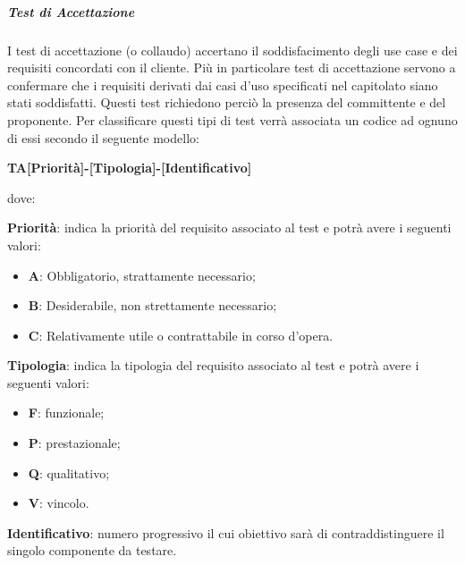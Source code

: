         \subparagraph*{Test di Accettazione}
            	I test di accettazione (o collaudo) accertano il soddisfacimento degli use case e dei requisiti concordati con il cliente.
                Più in particolare test di accettazione servono a confermare che i requisiti derivati dai casi d'uso specificati nel capitolato siano stati soddisfatti. Questi test richiedono perciò la presenza del committente e del proponente.  
                Per classificare questi tipi di test verrà associata un codice ad ognuno di essi secondo il seguente modello:
                
                \begin{center}
                \textbf{TA[Priorità]-[Tipologia]-[Identificativo]}
                \end{center}
                dove: 
                
                \textbf{Priorità}: indica la priorità del requisito associato al test e potrà avere i seguenti valori:
                \begin{itemize}
                    \item \textbf{A}: Obbligatorio, strattamente necessario;
                    \item \textbf{B}: Desiderabile, non strettamente necessario;
                    \item \textbf{C}: Relativamente utile o contrattabile in corso d'opera. 
                 \end{itemize} 
                 \textbf{Tipologia}: indica la tipologia del requisito associato al test e potrà avere i seguenti valori:
                 \begin{itemize}
                    \item \textbf{F}: funzionale;
                    \item \textbf{P}: prestazionale;
                    \item \textbf{Q}: qualitativo;
                    \item \textbf{V}: vincolo.
                 \end{itemize}
                \textbf{Identificativo}: numero progressivo il cui obiettivo sarà di contraddistinguere il singolo componente da testare.
